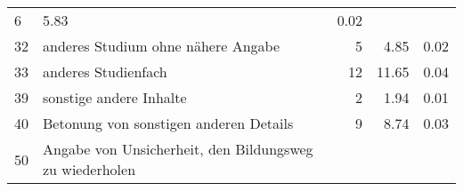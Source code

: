 \begin{longtable}{lXrrr}
       \num{6} &
       \num[round-mode=places,round-precision=2]{5,83} &
         \num[round-mode=places,round-precision=2]{0,02} \\

     32 &
     \multicolumn{1}{X}{ anderes Studium ohne nähere Angabe   } &


       \num{5} &
       \num[round-mode=places,round-precision=2]{4,85} &
         \num[round-mode=places,round-precision=2]{0,02} \\

     33 &
     \multicolumn{1}{X}{ anderes Studienfach   } &


       \num{12} &
       \num[round-mode=places,round-precision=2]{11,65} &
         \num[round-mode=places,round-precision=2]{0,04} \\

     39 &
     \multicolumn{1}{X}{ sonstige andere Inhalte   } &


       \num{2} &
       \num[round-mode=places,round-precision=2]{1,94} &
         \num[round-mode=places,round-precision=2]{0,01} \\

     40 &
     \multicolumn{1}{X}{ Betonung von sonstigen anderen Details   } &


       \num{9} &
       \num[round-mode=places,round-precision=2]{8,74} &
         \num[round-mode=places,round-precision=2]{0,03} \\

     50 &
     \multicolumn{1}{X}{ Angabe von Unsicherheit, den Bildungsweg zu wiederholen   } &



\end{longtable}
